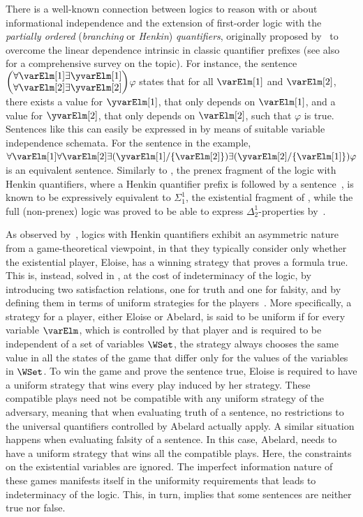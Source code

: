 \documentclass[authoryear]{elsarticle}
\begin{document}
There is a well-known connection between logics to reason with or about
informational independence and the extension of first-order logic with the
\emph{partially ordered} (\aka \emph{branching} or \emph{Henkin})
\emph{quantifiers}, originally proposed by~\cite{Hen61} to overcome the linear
dependence intrinsic in classic quantifier prefixes (see also~\cite{KM95} for a
comprehensive survey on the topic).  For instance, the sentence {\footnotesize
  $\left({\!\!\!
\begin{array}{c@{}c}
  {\forall \varElm[1]} & {\exists \yvarElm[1]}
\\
  {\forall \varElm[2]} & {\exists \yvarElm[2]}
\end{array}
}\!\!\!\right)$}$\varphi$
states that for all $\varElm[1]$ and $\varElm[2]$, there exists a value for
$\yvarElm[1]$, that only depends on $\varElm[1]$, and a value for $\yvarElm[2]$,
that only depends on $\varElm[2]$, such that $\varphi$ is true.
Sentences like this can easily be expressed in \IF by means of suitable variable
independence schemata.
For the sentence in the example, $\forall \varElm[1] \forall \varElm[2] \exists
(\yvarElm[1] / \{ \varElm[2] \}) \exists (\yvarElm[2] / \{ \varElm[1] \})
\varphi$ is an equivalent \IF sentence.
%
Similarly to \IF, the prenex fragment of the logic with Henkin quantifiers,
where a Henkin quantifier prefix is followed by a \FOL sentence~\citep{Wal70},
is known to be expressively equivalent to $\Sigma_{1}^{1}$, the existential
fragment of \SOL, while the full (non-prenex) logic was proved to be able to
express $\Delta_{2}^{1}$-properties by~\cite{End70}.

As observed by~\cite{BG86}, logics with Henkin quantifiers exhibit an asymmetric
nature from a game-theoretical viewpoint, in that they typically consider only
whether the existential player, Eloise, has a winning strategy that proves a
formula true.
This is, instead, solved in \IF, at the cost of indeterminacy of the logic, by
introducing two satisfaction relations, one for truth and one for falsity, and
by defining them in terms of uniform strategies for the players~\citep{MSS11}.
More specifically, a strategy for a player, either Eloise or Abelard, is said to
be uniform if for every variable $\varElm$, which is controlled by that player
and is required to be independent of a set of variables $\WSet$, the strategy
always chooses the same value in all the states of the game that differ only for
the values of the variables in $\WSet$.
To win the game and prove the sentence true, Eloise is required to have a
uniform strategy that wins every play induced by her strategy.
These compatible plays need not be compatible with any uniform strategy of the
adversary, meaning that when evaluating truth of a sentence, no restrictions to
the universal quantifiers controlled by Abelard actually apply.
A similar situation happens when evaluating falsity of a sentence.
In this case, Abelard, needs to have a uniform strategy that wins all the
compatible plays.
Here, the constraints on the existential variables are ignored.
The imperfect information nature of these games manifests itself in the
uniformity requirements that leads to indeterminacy of the logic.
This, in turn, implies that some sentences are neither true nor false.
\end{document}
